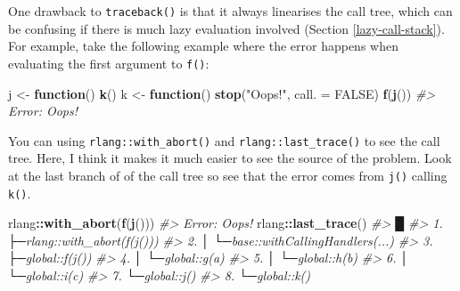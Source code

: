 \documentclass[]{book}
\makeatletter
\newenvironment{Shaded}{\begin{snugshade}}{\end{snugshade}}
\newcommand{\CommentTok}[1]{\textcolor[rgb]{0.37,0.37,0.37}{\textit{#1}}}
\newcommand{\ControlFlowTok}[1]{\textcolor[rgb]{0.27,0.27,0.27}{\textbf{#1}}}
\newcommand{\DataTypeTok}[1]{\textcolor[rgb]{0.27,0.27,0.27}{#1}}
\newcommand{\KeywordTok}[1]{\textcolor[rgb]{0.27,0.27,0.27}{\textbf{#1}}}
\newcommand{\NormalTok}[1]{#1}
\newcommand{\OperatorTok}[1]{\textcolor[rgb]{0.43,0.43,0.43}{\textbf{#1}}}
\newcommand{\OtherTok}[1]{\textcolor[rgb]{0.37,0.37,0.37}{#1}}
\newcommand{\StringTok}[1]{\textcolor[rgb]{0.5,0.5,0.5}{#1}}
\newcommand{\indexc}[1]{\index{#1@\texttt{#1}}}
\makeatother
\begin{document}
\indexc{last\_trace()}

One drawback to \texttt{traceback()} is that it always linearises the call tree, which can be confusing if there is much lazy evaluation involved (Section \ref{lazy-call-stack}). For example, take the following example where the error happens when evaluating the first argument to \texttt{f()}:

\begin{Shaded}
\begin{Highlighting}[]
\NormalTok{j <-}\StringTok{ }\ControlFlowTok{function}\NormalTok{() }\KeywordTok{k}\NormalTok{()}
\NormalTok{k <-}\StringTok{ }\ControlFlowTok{function}\NormalTok{() }\KeywordTok{stop}\NormalTok{(}\StringTok{"Oops!"}\NormalTok{, }\DataTypeTok{call. =} \OtherTok{FALSE}\NormalTok{)}
\KeywordTok{f}\NormalTok{(}\KeywordTok{j}\NormalTok{())}
\CommentTok{#> Error: Oops!}
\end{Highlighting}
\end{Shaded}

\begin{Shaded}
\end{Shaded}

You can using \texttt{rlang::with\_abort()} and \texttt{rlang::last\_trace()} to see the call tree. Here, I think it makes it much easier to see the source of the problem. Look at the last branch of of the call tree so see that the error comes from \texttt{j()} calling \texttt{k()}.

\begin{Shaded}
\begin{Highlighting}[]
\NormalTok{rlang}\OperatorTok{::}\KeywordTok{with_abort}\NormalTok{(}\KeywordTok{f}\NormalTok{(}\KeywordTok{j}\NormalTok{()))}
\CommentTok{#> Error: Oops!}
\NormalTok{rlang}\OperatorTok{::}\KeywordTok{last_trace}\NormalTok{()}
\CommentTok{#>     █}
\CommentTok{#>  1. ├─rlang::with_abort(f(j()))}
\CommentTok{#>  2. │ └─base::withCallingHandlers(...)}
\CommentTok{#>  3. ├─global::f(j())}
\CommentTok{#>  4. │ └─global::g(a)}
\CommentTok{#>  5. │   └─global::h(b)}
\CommentTok{#>  6. │     └─global::i(c)}
\CommentTok{#>  7. └─global::j()}
\CommentTok{#>  8.   └─global::k()}
\end{Highlighting}
\end{Shaded}
\end{document}
